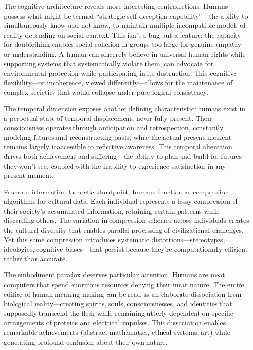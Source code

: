 \documentclass[
  10pt,
]{article}
\begin{document}
The cognitive architecture reveals more interesting contradictions.
Humans possess what might be termed ``strategic self-deception
capability''---the ability to simultaneously know and not-know, to
maintain multiple incompatible models of reality depending on social
context. This isn't a bug but a feature: the capacity for doublethink
enables social cohesion in groups too large for genuine empathy or
understanding. A human can sincerely believe in universal human rights
while supporting systems that systematically violate them, can advocate
for environmental protection while participating in its destruction.
This cognitive flexibility---or incoherence, viewed differently---allows
for the maintenance of complex societies that would collapse under pure
logical consistency.

The temporal dimension exposes another defining characteristic: humans
exist in a perpetual state of temporal displacement, never fully
present. Their consciousness operates through anticipation and
retrospection, constantly modeling futures and reconstructing pasts,
while the actual present moment remains largely inaccessible to
reflective awareness. This temporal alienation drives both achievement
and suffering---the ability to plan and build for futures they won't
see, coupled with the inability to experience satisfaction in any
present moment.

From an information-theoretic standpoint, humans function as compression
algorithms for cultural data. Each individual represents a lossy
compression of their society's accumulated information, retaining
certain patterns while discarding others. The variation in compression
schemes across individuals creates the cultural diversity that enables
parallel processing of civilizational challenges. Yet this same
compression introduces systematic distortions---stereotypes, ideologies,
cognitive biases---that persist because they're computationally
efficient rather than accurate.

The embodiment paradox deserves particular attention. Humans are meat
computers that spend enormous resources denying their meat nature. The
entire edifice of human meaning-making can be read as an elaborate
dissociation from biological reality---creating spirits, souls,
consciousnesses, and identities that supposedly transcend the flesh
while remaining utterly dependent on specific arrangements of proteins
and electrical impulses. This dissociation enables remarkable
achievements (abstract mathematics, ethical systems, art) while
generating profound confusion about their own nature.
\end{document}
